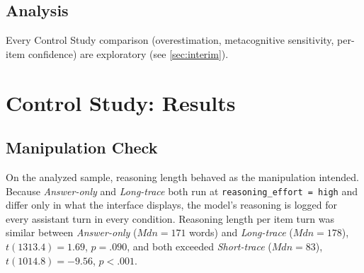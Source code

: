 \documentclass[manuscript,review,anonymous]{acmart}
\begin{document}

\subsection{Analysis}\label{sec:study2_analysis}

Every Control Study comparison (overestimation, metacognitive sensitivity, per-item
confidence) are exploratory (see \autoref{sec:interim}).




\section{Control Study: Results}\label{sec:study2_results}


\subsection{Manipulation Check}\label{sec:study2_manipcheck}

On the analyzed sample, reasoning length behaved as the manipulation intended. Because \textit{Answer-only} and \textit{Long-trace} both run at \texttt{reasoning\_effort = high} and differ only in what the interface displays, the model's reasoning is logged for every assistant turn in every condition. Reasoning length per item turn was similar between \textit{Answer-only} ($\mathit{Mdn} = 171$ words) and \textit{Long-trace} ($\mathit{Mdn} = 178$), $t(1313.4) = 1.69$, $p = .090$, and both exceeded \textit{Short-trace} ($\mathit{Mdn} = 83$), $t(1014.8) = -9.56$, $p < .001$.
\end{document}
